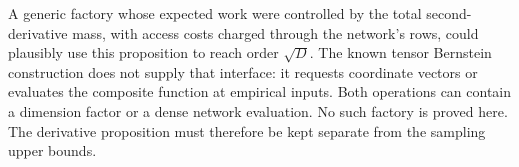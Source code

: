 A generic factory whose expected work were controlled by the total
second-derivative mass, with access costs charged through the network's
rows, could plausibly use this proposition to reach order $\sqrt D$.
The known tensor Bernstein construction does not supply that interface:
it requests coordinate vectors or evaluates the composite function at
empirical inputs.  Both operations can contain a dimension factor or a
dense network evaluation.  No such factory is proved here.  The
derivative proposition must therefore be kept separate from the
sampling upper bounds.
